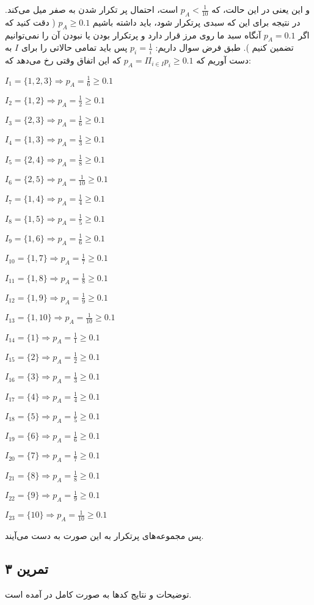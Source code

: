 \documentclass[a4paper,12pt]{article}
\newcommand{\problem}[1]
{
	\subsection*{
		تمرین
		#1
	}
}
\begin{document}
و این یعنی در این حالت، که 
$p_A < \frac{1 }{10}$
است، احتمال پر تکرار شدن به صفر میل می‌کند. در نتیجه برای این که سبدی پرتکرار شود، باید داشته باشیم 
$p_A \geq 0.1$
(
	دقت کنید که اگر 
	$p_A = 0.1$
	آنگاه سبد ما روی مرز قرار دارد و پرتکرار بودن یا نبودن آن را نمی‌توانیم تضمین کنیم
). 
طبق فرض سوال داریم: 
$p_i = \frac{1 }{i}$
پس باید تمامی حالاتی را برای
$I$
به دست آوریم که 
$p_A = \Pi_{i \in I} p_i \geq 0.1$
که این اتفاق وقتی رخ می‌دهد که:
\begin{LTR}
$I_1 = \{1,2,3\} \Rightarrow p_A = \frac{1}{6} \geq 0.1$

$I_2 = \{1,2\} \Rightarrow p_A = \frac{1}{2} \geq 0.1$

$I_3 = \{2,3\} \Rightarrow p_A = \frac{1}{6} \geq 0.1$

$I_4 = \{1,3\} \Rightarrow p_A = \frac{1}{3} \geq 0.1$

$I_5 = \{2,4\} \Rightarrow p_A = \frac{1}{8} \geq 0.1$

$I_6 = \{2,5\} \Rightarrow p_A = \frac{1}{10} \geq 0.1$

$I_7 = \{1,4\} \Rightarrow p_A = \frac{1}{4} \geq 0.1$

$I_8 = \{1,5\} \Rightarrow p_A = \frac{1}{5} \geq 0.1$

$I_9 = \{1,6\} \Rightarrow p_A = \frac{1}{6} \geq 0.1$

$I_{10} = \{1,7\} \Rightarrow p_A = \frac{1}{7} \geq 0.1$

$I_{11} = \{1,8\} \Rightarrow p_A = \frac{1}{8} \geq 0.1$

$I_{12} = \{1,9\} \Rightarrow p_A = \frac{1}{9} \geq 0.1$

$I_{13} = \{1,10\} \Rightarrow p_A = \frac{1}{10} \geq 0.1$

$I_{14} = \{1\} \Rightarrow p_A = \frac{1}{1} \geq 0.1$

$I_{15} = \{2\} \Rightarrow p_A = \frac{1}{2} \geq 0.1$

$I_{16} = \{3\} \Rightarrow p_A = \frac{1}{3} \geq 0.1$

$I_{17} = \{4\} \Rightarrow p_A = \frac{1}{4} \geq 0.1$

$I_{18} = \{5\} \Rightarrow p_A = \frac{1}{5} \geq 0.1$

$I_{19} = \{6\} \Rightarrow p_A = \frac{1}{6} \geq 0.1$

$I_{20} = \{7\} \Rightarrow p_A = \frac{1}{7} \geq 0.1$

$I_{21} = \{8\} \Rightarrow p_A = \frac{1}{8} \geq 0.1$

$I_{22} = \{9\} \Rightarrow p_A = \frac{1}{9} \geq 0.1$

$I_{23} = \{10\} \Rightarrow p_A = \frac{1}{10} \geq 0.1$

\end{LTR}

پس مجموعه‌های پرتکرار به این صورت به دست می‌آیند. 





\problem{۳}
توضیحات و نتایج کدها به صورت کامل در 
آمده است. 
\end{document}
